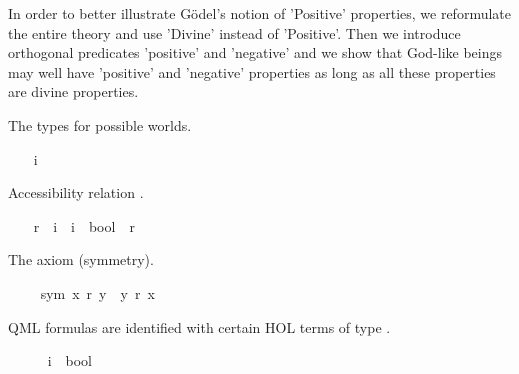 %
\begin{isabellebody}%
\def\isabellecontext{GoedelGodDivine}%
%
\isadelimtheory
%
\endisadelimtheory
%
\isatagtheory
%
\endisatagtheory
{\isafoldtheory}%
%
\isadelimtheory
%
\endisadelimtheory
%
\begin{isamarkuptext}%
\newpage%
\end{isamarkuptext}%
\isamarkuptrue%
%
\isamarkuptrue%
%
\begin{isamarkuptext}%
In order to better illustrate G\"odel's notion of 'Positive' properties, we reformulate the
entire theory and use 'Divine' instead of 'Positive'. Then we introduce orthogonal predicates 
'positive' and 'negative' and we show that God-like beings may well have 'positive' and 
'negative' properties as long as all these properties are divine properties.%
\end{isamarkuptext}%
\isamarkuptrue%
%
\begin{isamarkuptext}%
The types  for possible worlds.%
\end{isamarkuptext}%
\isamarkuptrue%
\ \ \isamarkupfalse%
\ i\ \ \ \ %
\ \isanewline
\ \ \isamarkupfalse%
\ {\isasymmu}\ \ \ \ %
%
\begin{isamarkuptext}%
Accessibility relation .%
\end{isamarkuptext}%
\isamarkuptrue%
\ \ \isamarkupfalse%
\ r\ {\isacharcolon}{\isacharcolon}\ {\isachardoublequoteopen}i\ {\isasymRightarrow}\ i\ {\isasymRightarrow}\ bool{\isachardoublequoteclose}\ {\isacharparenleft}\ {\isachardoublequoteopen}r{\isachardoublequoteclose}\ {}{}{\isacharparenright}\ \ \ \ %
%
\begin{isamarkuptext}%
The  axiom (symmetry).%
\end{isamarkuptext}%
\isamarkuptrue%
\ \ \isamarkupfalse%
\ \ sym{\isacharcolon}\ {\isachardoublequoteopen}x\ r\ y\ {\isasymlongrightarrow}\ y\ r\ x{\isachardoublequoteclose}%
\begin{isamarkuptext}%
QML formulas are identified with certain HOL terms of type .%
\end{isamarkuptext}%
\isamarkuptrue%
\ \ \isamarkupfalse%
\ {\isasymsigma}\ {\isacharequal}\ {\isachardoublequoteopen}{\isacharparenleft}i\ {\isasymRightarrow}\ bool{\isacharparenright}{\isachardoublequoteclose}%

\end{isabellebody}
